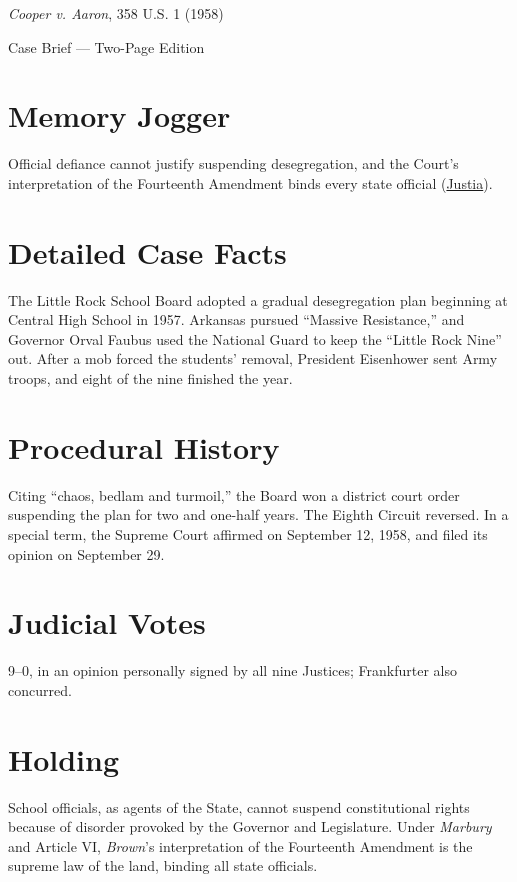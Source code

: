 \documentclass[12pt]{article}
\begin{document}
\begin{center}
{\LARGE \textit{Cooper v. Aaron}, 358 U.S. 1 (1958)\par}
\vspace{0.5em}
{\large Case Brief --- Two-Page Edition\par}
\end{center}

\section{Memory Jogger}
Official defiance cannot justify suspending desegregation, and the Court's interpretation of the Fourteenth Amendment binds every state official (\href{https://supreme.justia.com/cases/federal/us/358/1/}{Justia}).

\section{Detailed Case Facts}
The Little Rock School Board adopted a gradual desegregation plan beginning at Central High School in 1957. Arkansas pursued ``Massive Resistance,'' and Governor Orval Faubus used the National Guard to keep the ``Little Rock Nine'' out. After a mob forced the students' removal, President Eisenhower sent Army troops, and eight of the nine finished the year.

\section{Procedural History}
Citing ``chaos, bedlam and turmoil,'' the Board won a district court order suspending the plan for two and one-half years. The Eighth Circuit reversed. In a special term, the Supreme Court affirmed on September 12, 1958, and filed its opinion on September 29.

\section{Judicial Votes}
9--0, in an opinion personally signed by all nine Justices; Frankfurter also concurred.

\section{Holding}
School officials, as agents of the State, cannot suspend constitutional rights because of disorder provoked by the Governor and Legislature. Under \textit{Marbury} and Article VI, \textit{Brown}'s interpretation of the Fourteenth Amendment is the supreme law of the land, binding all state officials.
\end{document}
